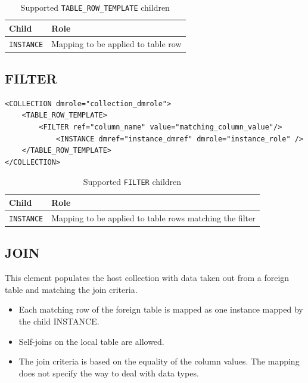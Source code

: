 \documentclass[11pt,a4paper]{ivoa}
\begin{document}
\begin{table}[hbtp]
\small
\centering
\begin{tabulary}{\linewidth}{|L|J|}
       \hline  
          \textbf{Child} &  
          \textbf{Role}\\
       \hline  
          \texttt{INSTANCE}    & 
          Mapping to be applied to table row \\       
       \hline 
     \end{tabulary}
     \caption{Supported  \texttt{TABLE\_ROW\_TEMPLATE} children} 
     \label{trt:row-children}
\end{table}



%
%
\subsection{FILTER}

\begin{lstlisting}[caption={FILTER examples},style=XML]
<COLLECTION dmrole="collection_dmrole">
    <TABLE_ROW_TEMPLATE>
        <FILTER ref="column_name" value="matching_column_value"/>
            <INSTANCE dmref="instance_dmref" dmrole="instance_role" />
    </TABLE_ROW_TEMPLATE>
</COLLECTION>
\end{lstlisting}

\begin{table}[hbtp]
\small
\centering
\begin{tabulary}{\linewidth}{|L|J|}
       \hline  
          \textbf{Child} &  
          \textbf{Role}\\
       \hline  
          \texttt{INSTANCE}    & 
          Mapping to be applied to table rows matching the filter \\       
       \hline 
     \end{tabulary}
     \caption{Supported  \texttt{FILTER} children} 
     \label{tbl:filter-children}
\end{table}



%
%
\subsection{JOIN}
This element populates the host collection with data taken out from a foreign table and matching the join criteria.

\begin{itemize}
    \item Each matching row of the foreign table is mapped as one instance mapped by the child INSTANCE.
    \item Self-joins  on the local table are allowed.
    \item The join criteria is based on the equality of the column values. 
             The mapping does not specify the way to deal with data types.
\end{itemize}
\end{document}
